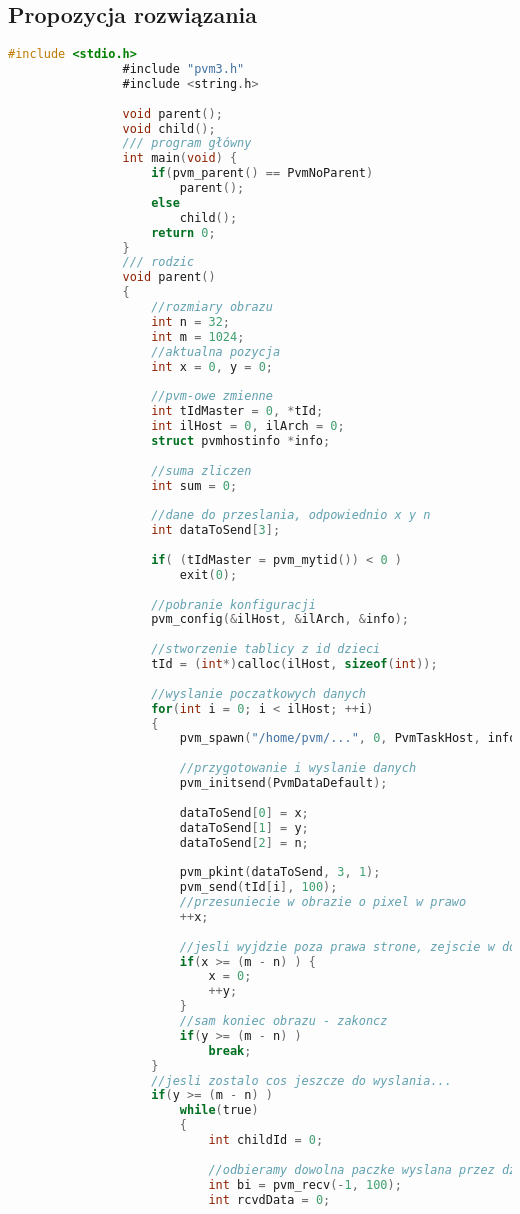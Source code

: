 		\subsection{Propozycja rozwiązania}
			\begin{lstlisting}[language=C]
				#include <stdio.h>
				#include "pvm3.h"
				#include <string.h>
				
				void parent();
				void child();
				/// program główny
				int main(void) {
					if(pvm_parent() == PvmNoParent)
						parent();
					else
						child();
					return 0;
				}
				/// rodzic
				void parent()
				{
					//rozmiary obrazu
					int n = 32;
					int m = 1024;
					//aktualna pozycja
					int x = 0, y = 0;
					
					//pvm-owe zmienne
					int tIdMaster = 0, *tId;
					int ilHost = 0, ilArch = 0;
					struct pvmhostinfo *info;
					
					//suma zliczen
					int sum = 0;
					
					//dane do przeslania, odpowiednio x y n
					int dataToSend[3];
					
					if( (tIdMaster = pvm_mytid()) < 0 )
						exit(0);
					
					//pobranie konfiguracji
					pvm_config(&ilHost, &ilArch, &info);
					
					//stworzenie tablicy z id dzieci
					tId = (int*)calloc(ilHost, sizeof(int));
					
					//wyslanie poczatkowych danych
					for(int i = 0; i < ilHost; ++i)
					{
						pvm_spawn("/home/pvm/...", 0, PvmTaskHost, info[i].hi_name, 1, &tId[i]);
						
						//przygotowanie i wyslanie danych
						pvm_initsend(PvmDataDefault);
						
						dataToSend[0] = x;
						dataToSend[1] = y;
						dataToSend[2] = n;
						
						pvm_pkint(dataToSend, 3, 1);
						pvm_send(tId[i], 100);
						//przesuniecie w obrazie o pixel w prawo
						++x;
						
						//jesli wyjdzie poza prawa strone, zejscie w dol
						if(x >= (m - n) ) {
							x = 0;
							++y;
						}
						//sam koniec obrazu - zakoncz
						if(y >= (m - n) )
							break;
					}
					//jesli zostalo cos jeszcze do wyslania...
					if(y >= (m - n) )
						while(true)
						{
							int childId = 0;
							
							//odbieramy dowolna paczke wyslana przez dzieci
							int bi = pvm_recv(-1, 100);
							int rcvdData = 0;
							

\end{lstlisting}
